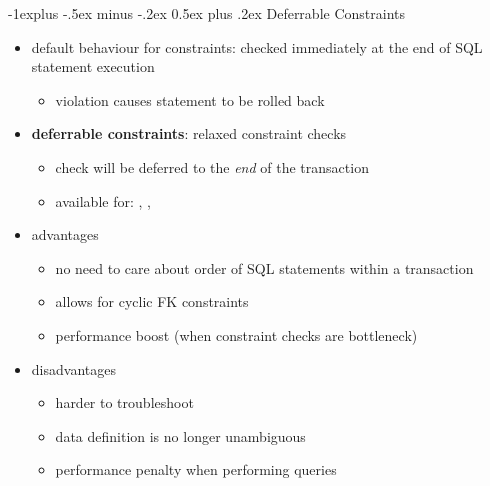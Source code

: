 \documentclass[10pt, landscape]{article}
\makeatletter
\renewcommand{\subsection}{\@startsection{subsection}{2}{0mm}%
  {-1explus -.5ex minus -.2ex}%
  {0.5ex plus .2ex}%
{\normalfont\normalsize\bfseries}}
\makeatother
\begin{document}
\begin{multicols}{3}
  \subsection{Deferrable Constraints}
  \begin{itemize}
    \item default behaviour for constraints: checked immediately at the end of SQL statement execution
      \begin{itemize}
        \item violation causes statement to be rolled back
      \end{itemize}
    \item \textbf{deferrable constraints}: relaxed constraint checks
      \begin{itemize}
        \item check will be deferred to the \textit{end} of the transaction
        \item available for: , , 
      \end{itemize}
    \item advantages
      \begin{itemize}
        \item no need to care about order of SQL statements within a transaction
        \item allows for cyclic FK constraints
        \item performance boost (when constraint checks are bottleneck)
      \end{itemize}
    \item disadvantages
      \begin{itemize}
        \item harder to troubleshoot
        \item data definition is no longer unambiguous
        \item performance penalty when performing queries
      \end{itemize}
  \end{itemize}


\end{multicols}
\end{document}
